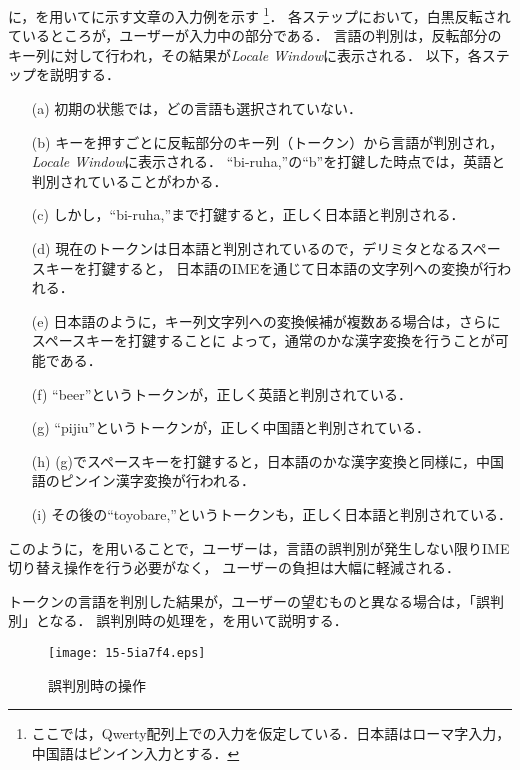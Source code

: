 \documentclass[japanese]{jnlp_1.4}
\newcommand{\name}{}
\newcommand{\figref}[1]{}
\begin{document}
\figref{fig:entryflow}に，{\name}を用いて\figref{fig:toyota}に示す文章の入力例を示す
\footnote{ここでは，Qwerty配列上での入力を仮定している．日本語はローマ字入力，中国語はピンイン入力とする．}．
各ステップにおいて，白黒反転されているところが，ユーザーが入力中の部分である．
言語の判別は，反転部分のキー列に対して行われ，その結果が{\em Locale Window}に表示される．
以下，各ステップを説明する．

    \begin{itemize} 
\item[(a)] 初期の状態では，どの言語も選択されていない．
\item[(b)] キーを押すごとに反転部分のキー列（トークン）から言語が判別され，{\em Locale Window}に表示される．
``bi-ruha,''の``b''を打鍵した時点では，英語と判別されていることがわかる． 
\item[(c)] しかし，``bi-ruha,''まで打鍵すると，正しく日本語と判別される．
\item[(d)] 現在のトークンは日本語と判別されているので，デリミタとなるスペースキーを打鍵すると，
日本語のIMEを通じて日本語の文字列への変換が行われる．
\item[(e)] 日本語のように，キー列文字列への変換候補が複数ある場合は，さらにスペースキーを打鍵することに
よって，通常のかな漢字変換を行うことが可能である．
\item[(f)] ``beer''というトークンが，正しく英語と判別されている．
\item[(g)] ``pijiu''というトークンが，正しく中国語と判別されている．
\item[(h)] (g)でスペースキーを打鍵すると，日本語のかな漢字変換と同様に，中国語のピンイン漢字変換が行われる．
\item[(i)] その後の``toyobare,''というトークンも，正しく日本語と判別されている．
    \end{itemize} 

このように，{\name}を用いることで，ユーザーは，言語の誤判別が発生しない限りIME切り替え操作を行う必要がなく，
ユーザーの負担は大幅に軽減される．

トークンの言語を判別した結果が，ユーザーの望むものと異なる場合は，「誤判別」となる．
誤判別時の処理を，\figref{fig:detectionfail}を用いて説明する．

\begin{figure}[b] 
  \begin{center}
\texttt{[image: 15-5ia7f4.eps]}
    \caption{誤判別時の操作} 
    \label{fig:detectionfail} 
  \end{center}
\end{figure}
\end{document}

